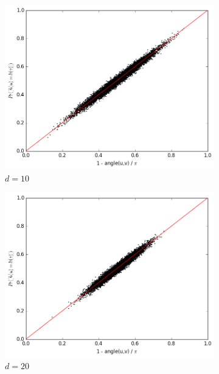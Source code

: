 \documentclass{ethz_report}
\begin{document}
\begin{figure}[h]
\begin{subfigure}[b]{.5\textwidth}
    \includegraphics[width=1\linewidth]{../code/simulation_vs_similarity_10.png}
    \caption{$d = 10$}
\end{subfigure}%
\begin{subfigure}[b]{.5\textwidth}
    \includegraphics[width=1\linewidth]{../code/simulation_vs_similarity_20.png}
    \caption{$d = 20$}
\end{subfigure}
\begin{subfigure}[b]{.5\textwidth}

\end{subfigure}
\end{figure}
\end{document}
